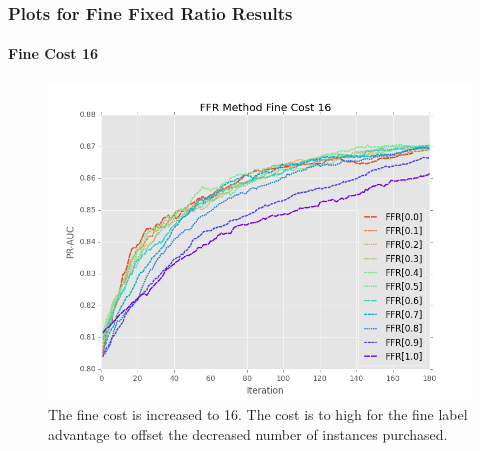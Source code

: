 \documentclass{beamer}
\begin{document}
\begin{frame}
    \frametitle{Plots for Fine Fixed Ratio Results}
    \framesubtitle{Fine Cost 16}
    \begin{figure}[!htb]
        \centering
        \includegraphics[width=0.7\columnwidth]{fig/ParamsFFR_PR_Cost16_rnds0_180}
        \caption{The fine cost is increased to 16. The cost is to high for the fine label advantage to offset
        the decreased number of instances purchased.}
        \label{fig:ParamsFFR_PR_Cost16_rnds0_180}
    \end{figure}
\end{frame}
\end{document}
